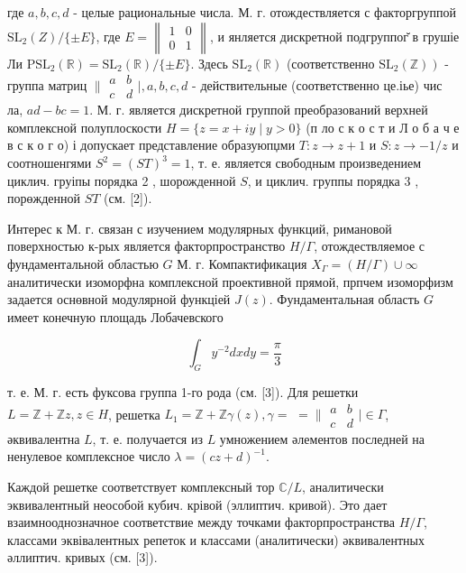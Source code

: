 \documentclass[10pt]{article}
\begin{document}
где $a, b, c, d$ - целые рациональные числа. М. г. отождествляется с факторгруппой $\mathrm{SL}_{2}(Z) /\{ \pm E\}$, где $E=\left\|\begin{array}{ll}1 & 0 \\ 0 & 1\end{array}\right\|$, и янляется дискретной подгруппог̆ в грушіе Ли $\mathrm{PSL}_{2}(\mathbb{R})=\mathrm{SL}_{2}(\mathbb{R}) /\{ \pm E\}$. Здесь $\mathrm{SL}_{2}(\mathbb{R})$ (соответственно $\left.\mathrm{SL}_{2}(\mathbb{Z})\right)$ - группа матриц $\| \begin{array}{ll}a & b \\ c & d\end{array} \mid, a, b, c, d$ - действительные (соответственно це.іье) чис ла, $a d-b c=1$. М. г. является дискретной группой преобразований верхней комплексной полуплоскости $H=\{z=x+i y \mid y>0\}$ (п ло с к о с т и Л о б а ч е в с к о г о) і допускает представление образуюпџми $T: z \rightarrow z+1$ и $S: z \rightarrow-1 / z$ и соотношенгями $S^{2}=(S T)^{3}=1$, т. е. является свободным произведением циклич. груіпы порядка 2 , шорожденной $S$, и циклич. группы порядка 3 , порөжденной $S T$ (см. [2]).



Интерес к М. г. связан с изучением модулярных функций, римановой поверхностью к-рых является факторпространство $H / \Gamma$, отождествляемое с фундаментальной областью $G$ М. г. Компактификация $X_{\Gamma}=(H / \Gamma) \cup \infty$ аналитически изоморфна комплексной проективной прямой, прпчем изоморфизм задается оснөвной модулярной функціей $J(z)$. Фундаментальная область $G$ имеет конечную площадь Лобачевского



\[

\int_{G} y^{-2} d x d y=\frac{\pi}{3}

\]



т. е. М. г. есть фуксова группа 1-го рода (см. [3]). Для решетки $L=\mathbb{Z}+\mathbb{Z} z, z \in H$, решетка $L_{1}=\mathbb{Z}+\mathbb{Z} \gamma(z), \gamma=$ $=\| \begin{array}{ll}a & b \\ c & d\end{array} \mid \in \Gamma$, әквивалентна $L$, т. е. получается из $L$ умножением әлементов последней на ненулевое комплексное число $\lambda=(c z+d)^{-1}$.



Каждой решетке соответствует комплексный тор $\mathbb{C} / L$, аналитически эквивалентный неособой кубич. крівой (эллиптич. кривой). Это дает взаимнооднозначное соответствие между точками факторпространства $H / \Gamma$, классами эквівалентных репеток и классами (аналитически) әквивалентных әллиптич. кривых (см. [3]).
\end{document}

